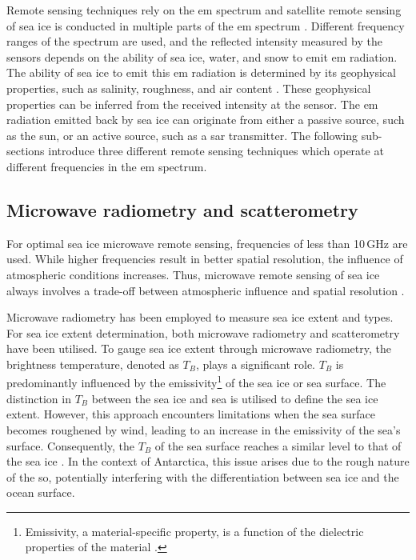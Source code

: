 Remote sensing techniques rely on the \ac{em} spectrum and satellite remote sensing of sea ice is conducted in multiple parts of the \acs{em} spectrum \cite{Thomas2017Chap9}. Different frequency ranges of the spectrum are used, and the reflected intensity measured by the sensors depends on the ability of sea ice, water, and snow to emit \acs{em} radiation. The ability of sea ice to emit this \acs{em} radiation is determined by its geophysical properties, such as salinity, roughness, and air content \cite{Thomas2017Chap9}. These geophysical properties can be inferred from the received intensity at the sensor. The \acs{em} radiation emitted back by sea ice can originate from either a passive source, such as the sun, or an active source, such as a \acs{sar} transmitter. The following sub-sections introduce three different remote sensing techniques which operate at different frequencies in the \acs{em} spectrum.

\subsection{Microwave radiometry and scatterometry} \label{subsec:litReview.seaIceCharac.radiometry}

For optimal sea ice microwave remote sensing, frequencies of less than 10\,GHz are used. While higher frequencies result in better spatial resolution, the influence of atmospheric conditions increases. Thus, microwave remote sensing of sea ice always involves a trade-off between atmospheric influence and spatial resolution \cite{Thomas2017Chap9}.

Microwave radiometry has been employed to measure sea ice extent and types. For sea ice extent determination, both microwave radiometry and scatterometry have been utilised. To gauge sea ice extent through microwave radiometry, the brightness temperature, denoted as $T_{B}$, plays a significant role. $T_{B}$ is predominantly influenced by the emissivity\footnote{Emissivity, a material-specific property, is a function of the dielectric properties of the material \cite{Thomas2017Chap9}.} of the sea ice or sea surface. The distinction in $T_{B}$ between the sea ice and sea is utilised to define the sea ice extent. However, this approach encounters limitations when the sea surface becomes roughened by wind, leading to an increase in the emissivity of the sea's surface. Consequently, the $T_{B}$ of the sea surface reaches a similar level to that of the sea ice \cite{Thomas2017Chap9}. In the context of Antarctica, this issue arises due to the rough nature of the \acs{so}, potentially interfering with the differentiation between sea ice and the ocean surface. 

